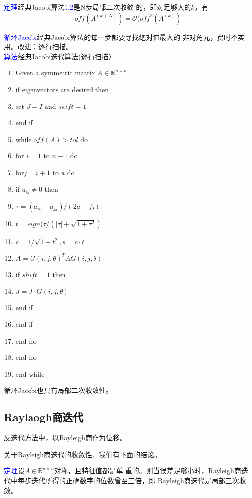 \documentclass[12pt,a4paper]{article}
\begin{document}
\textcolor{blue}{定理}\quad 经典Jacobi算法\textcolor{blue}{1.2}是N步局部二次收敛
的，即对足够大的$k$，有$$off(A^{(k+N)})=\mathcal O(off^2(A^{(k)})$$

\textcolor{blue}{循环Jacobi}\quad 经典Jacobi算法的每一步都要寻找绝对值最大的
非对角元，费时不实用。改进：逐行扫描。\\
\textcolor{blue}{算法}\quad 经典Jacobi迭代算法(逐行扫描）
\begin{enumerate}[1:]
	\item Given a symmetric matrix $A\in \mathbb R^{n\times n}$
	\item if eigenvectors are desired then
	\item \quad set $J=I$ and $shift=1$
	\item end if
	\item while $off(A)>tol$ do
	\item \quad for $i=1$ to $n-1$ do
	\item \qquad for$j=i+1$ to $n$ do
	\item \qquad \quad if $a_{ij}\neq 0$ then
	\item \qquad \qquad $\tau=(a_{ii}-a_{jj})/(2a-{jj})$
	\item \qquad \qquad $t=sign(\tau/(|\tau|+\sqrt{1+\tau ^2})$
	\item \qquad \qquad $c=1/\sqrt{1+t^2},s=c·t$
	\item \qquad \qquad $A=G(i,j,\theta)^TAG(i,j,\theta)$
	\item \qquad \qquad if $shift=1$ then
	\item \qquad \qquad \quad$J=J·G(i,j,\theta)$
	\item \qquad \qquad end if
	\item \qquad \quad end if
	\item \qquad end for
	\item \quad end for
	\item end while
\end{enumerate}

循环Jacobi也具有局部二次收敛性。
\subsection{Raylaogh商迭代}
反迭代方法中，以Rayleigh商作为位移。

关于Rayleigh商迭代的收敛性，我们有下面的结论。

\textcolor{blue}{定理}\quad 设$A\in \mathbb R^{n\times n}$对称，且特征值都是单
重的。则当误差足够小时，Rayleigh商迭代中每步迭代所得的正确数字的位数曾至三倍，即
Rayleigh商迭代是局部三次收敛。
\end{document}
